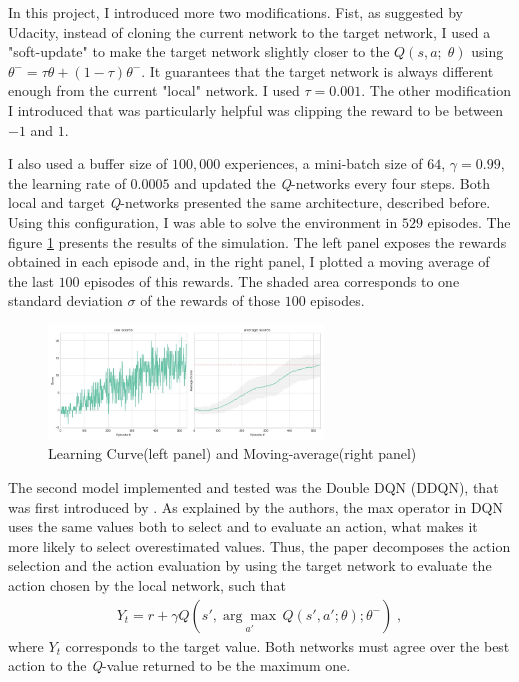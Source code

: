 \documentclass[a4paper]{article}
\begin{document}
In this project, I introduced more two modifications. Fist, as suggested by Udacity, instead of cloning the current network to the target network, I used a "soft-update" to make the target network slightly closer to the $Q(s, a; \;\theta)$ using $\theta^{-}= \tau \theta + (1- \tau)\theta^{-} $. It guarantees that the target network is always different enough from the current "local" network. I used $\tau=0.001$. The other modification I introduced that was particularly helpful was clipping the reward to be between $-1$ and $1$.

I also used a buffer size of $100,000$ experiences, a mini-batch size of $64$, $\gamma=0.99$, the learning rate of $0.0005$ and updated the \textit{Q}-networks every four steps. Both local and target \textit{Q}-networks presented the same architecture, described before. Using this configuration, I was able to solve the environment in $529$ episodes. The figure \ref{fig:dqn} presents the results of the simulation. The left panel exposes the rewards obtained in each episode and, in the right panel, I plotted a moving average of the last $100$ episodes of this rewards. The shaded area corresponds to one standard deviation $\sigma$ of the rewards of those $100$ episodes.

\begin{figure}[ht]
\centering
\includegraphics[width=0.65\textwidth]{../notebooks/figures/2018-08-24-dqn.jpg}
\caption{Learning Curve(left panel) and Moving-average(right panel)}
\label{fig:dqn}
\end{figure}


The second model implemented and tested was the Double DQN (DDQN), that was first introduced by \cite{HasseltGS15}. As explained by the authors, the max operator in DQN uses the same values both to select and to evaluate an action, what makes it more likely to select overestimated values. Thus, the paper decomposes the action selection and the action evaluation by using the target network to evaluate the action chosen by the local network, such that
\begin{gather*}
  Y_t = r + \gamma Q (s', \underset{a'}{\arg \max} \, Q (s', a'; \theta);\theta^{-}) \;,
\end{gather*}
where $Y_t$ corresponds to the target value. Both networks must agree over the best action to the \textit{Q}-value returned to be the maximum one.
\end{document}
